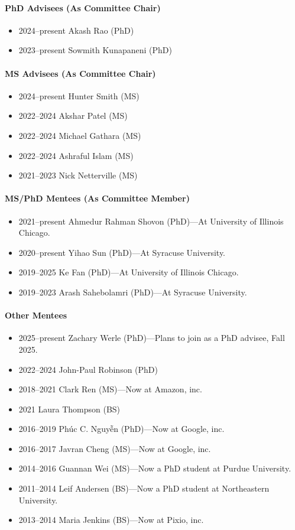 \paragraph{PhD Advisees (As Committee Chair)}
\begin{itemize}
\vspace{0.15cm}\item 2024--present Akash Rao (PhD)
\item 2023--present Sowmith Kunapaneni (PhD)
\end{itemize}
\paragraph{MS Advisees (As Committee Chair)}
\begin{itemize}
\vspace{0.15cm}\item 2024--present Hunter Smith (MS)
\item 2022--2024 Akshar Patel (MS)
\item 2022--2024 Michael Gathara (MS)
\item 2022--2024 Ashraful Islam (MS)
\item 2021--2023 Nick Netterville (MS)
\end{itemize}
\paragraph{MS/PhD Mentees (As Committee Member)}
\begin{itemize}
\vspace{0.15cm}\item 2021--present Ahmedur Rahman Shovon (PhD)---At University of Illinois Chicago.
\item 2020--present Yihao Sun (PhD)---At Syracuse University.
\item 2019--2025 Ke Fan (PhD)---At University of Illinois Chicago.
\item 2019--2023 Arash Sahebolamri (PhD)---At Syracuse University.
\end{itemize}
\paragraph{Other Mentees}
\begin{itemize}
\vspace{0.15cm}\item 2025--present Zachary Werle (PhD)---Plans to join as a PhD advisee, Fall 2025.
\item 2022--2024 John-Paul Robinson (PhD)
\item 2018--2021 Clark Ren (MS)---Now at Amazon, inc.
\item 2021 Laura Thompson (BS)
\item 2016--2019 Phúc C. Nguyễn (PhD)---Now at Google, inc.
\item 2016--2017 Javran Cheng (MS)---Now at Google, inc.
\item 2014--2016 Guannan Wei (MS)---Now a PhD student at Purdue University.
\item 2011--2014 Leif Andersen (BS)---Now a PhD student at Northeastern University.
\item 2013--2014 Maria Jenkins (BS)---Now at Pixio, inc.
\end{itemize}
